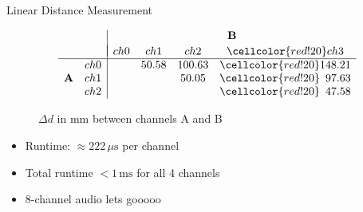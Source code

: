 \begin{frame}[fragile]{Linear Distance Measurement}
	
	\begin{figure}
		\centering
		\[
		\begin{array}{c c|cccc}
			& & \multicolumn{4}{c}{\mathbf{B}} \\
			& & \multicolumn{4}{c}{\rule{0pt}{0.5em}} \\[-1em]
			& & ch0 & ch1 & ch2 & \cellcolor{red!20}ch3 \\ \hline
			& ch0 &       & 50.58  & 100.63 & \cellcolor{red!20}148.21 \\
			\mathbf{A} & ch1 &       &        & 50.05  & \cellcolor{red!20}\phantom{0}97.63  \\
			& ch2 &       &        &         & \cellcolor{red!20}\phantom{0}47.58
		\end{array}
		\]
		
		
		
		
		
		\caption{$\Delta d$ in mm between channels A and B}
	\end{figure}
	
	\vspace{-0.5em}
	
	\begin{itemize}
		\item Runtime: $\approx 222\,\mu\mathrm{s}$ per channel
		\item Total runtime  $< 1\,\mathrm{ms}$ for all 4 channels
		\item 8-channel audio lets gooooo
	\end{itemize}
	
\end{frame}






